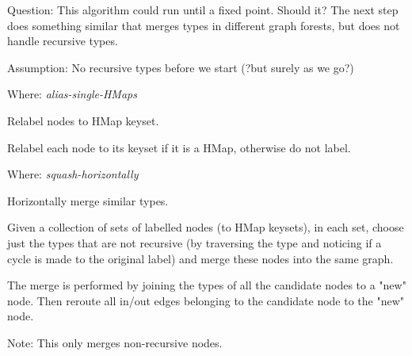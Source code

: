 Question: This algorithm could run until a fixed point.
Should it? The next step does something similar that
merges types in different graph forests, but does
not handle recursive types.

Assumption: No recursive types before we start 
(?but surely as we go?)


Where: \emph{alias-single-HMaps}

Relabel nodes to HMap keyset.

Relabel each node to its keyset if it is
a HMap, otherwise do not label.


Where: \emph{squash-horizontally}

Horizontally merge similar types.

Given a collection of sets of labelled nodes (to HMap
keysets), in each set, choose just the types
that are not recursive (by traversing the type and
noticing if a cycle is made to the original label)
and merge these nodes into the same graph.

The merge is performed by joining the types
of all the candidate nodes to a "new" node. Then reroute all
in/out edges belonging to the candidate
node to the "new" node.

Note: This only merges non-recursive nodes.

